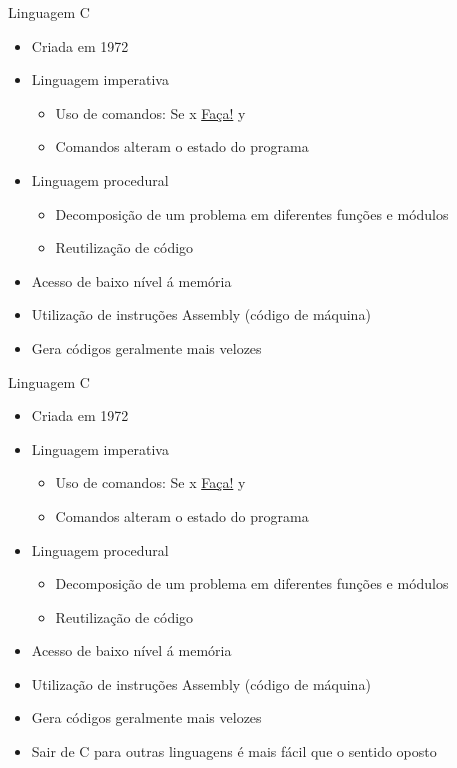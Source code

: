 \documentclass[t, aspectratio=169]{beamer}
\begin{document}
\begin{frame}[label={sec:org9172e06}]{Linguagem C}
\begin{itemize}
\item Criada em 1972

\item Linguagem imperativa
\begin{itemize}
\item Uso de comandos: Se \alert{x} \uline{Faça!} \alert{y}
\item Comandos alteram o estado do programa
\end{itemize}

\item Linguagem procedural
\begin{itemize}
\item Decomposição de um problema em diferentes funções e módulos
\item Reutilização de código
\end{itemize}

\item Acesso de baixo nível á memória
\item Utilização de instruções Assembly (código de máquina)
\item Gera códigos geralmente mais velozes
\end{itemize}
\end{frame}

\begin{frame}[label={sec:org2cbc23e}]{Linguagem C}
\begin{itemize}
\item Criada em 1972

\item Linguagem imperativa
\begin{itemize}
\item Uso de comandos: Se \alert{x} \uline{Faça!} \alert{y}
\item Comandos alteram o estado do programa
\end{itemize}

\item Linguagem procedural
\begin{itemize}
\item Decomposição de um problema em diferentes funções e módulos
\item Reutilização de código
\end{itemize}

\item Acesso de baixo nível á memória
\item Utilização de instruções Assembly (código de máquina)
\item Gera códigos geralmente mais velozes

\item Sair de C para outras linguagens é mais fácil que o sentido oposto
\end{itemize}
\end{frame}
\end{document}
